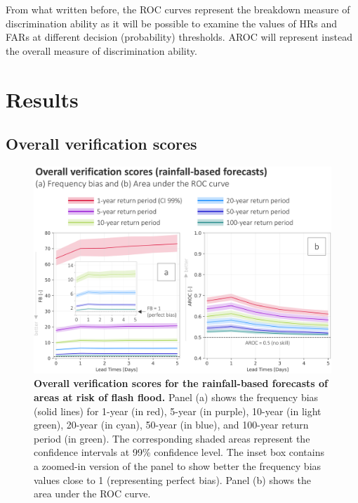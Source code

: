 From what written before, the ROC curves represent the breakdown measure of discrimination ability as it will be possible to examine the values of HRs and FARs at different decision (probability) thresholds. AROC will represent instead the overall measure of discrimination ability.

\section{Results}
\label{flash_flood_focused_verification_rainfall_based_ff_RESULTS}


\subsection{Overall verification scores}

\begin{figure}[htbp]
\centering
\includegraphics[width=\textwidth]{rainfall_based_ff_verif_overall_scores.png}
\caption{\textbf{Overall verification scores for the rainfall-based forecasts of areas at risk of flash flood.} Panel (a) shows the frequency bias (solid lines) for 1-year (in red), 5-year (in purple), 10-year (in light green), 20-year (in cyan), 50-year (in blue), and 100-year return period (in green). The corresponding shaded areas represent the confidence intervals at 99\% confidence level. The inset box contains a zoomed-in version of the panel to show better the frequency bias values close to 1 (representing perfect bias). Panel (b) shows the area under the ROC curve.}
\label{fig:rainfall_based_ff_verif_overall_scores}
\end{figure}

